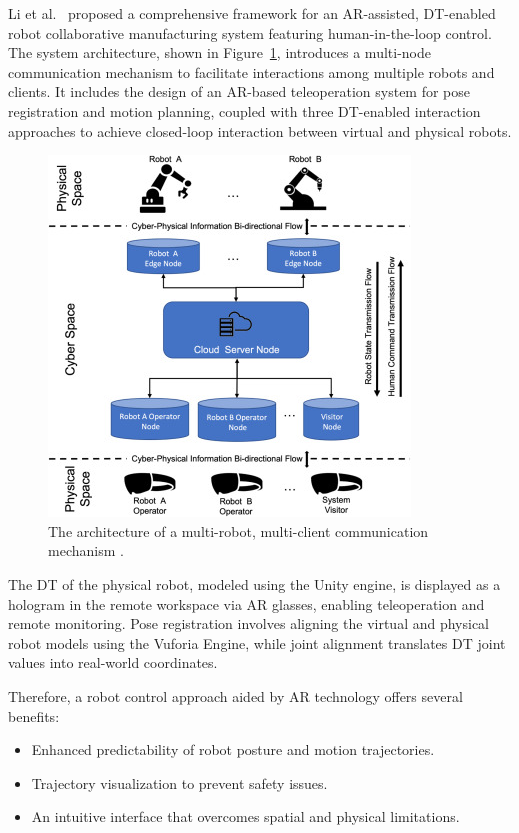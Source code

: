 Li et al.~\cite{LI2022102321} proposed a comprehensive framework for an \ac{AR}-assisted, \ac{DT}-enabled robot collaborative manufacturing system featuring human-in-the-loop control. The system architecture, shown in Figure~\ref{f:system-framework}, introduces a multi-node communication mechanism to facilitate interactions among multiple robots and clients. It includes the design of an \ac{AR}-based teleoperation system for pose registration and motion planning, coupled with three \ac{DT}-enabled interaction approaches to achieve closed-loop interaction between virtual and physical robots.

\begin{figure}[!htpb]
    \centering
    \includegraphics[width=0.5\linewidth]{figs/framework.jpg}
    \caption{The architecture of a multi-robot, multi-client communication mechanism \cite{LI2022102321}.}
    \label{f:system-framework}
\end{figure}

The \ac{DT} of the physical robot, modeled using the Unity engine, is displayed as a hologram in the remote workspace via \ac{AR} glasses, enabling teleoperation and remote monitoring. Pose registration involves aligning the virtual and physical robot models using the Vuforia Engine, while joint alignment translates \ac{DT} joint values into real-world coordinates.

Therefore, a robot control approach aided by \ac{AR} technology offers several benefits:
\begin{itemize}
    \item Enhanced predictability of robot posture and motion trajectories.
    \item Trajectory visualization to prevent safety issues.
    \item An intuitive interface that overcomes spatial and physical limitations.
\end{itemize}

